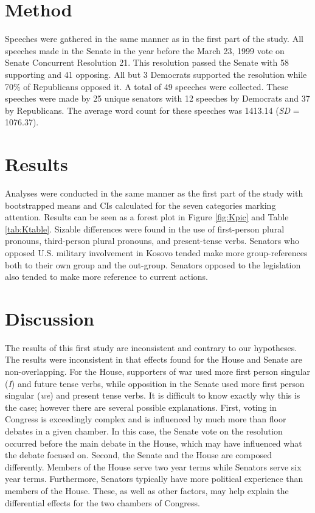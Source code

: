 \documentclass[english,,man]{apa6}
\theoremstyle{definition}
\theoremstyle{definition}
\theoremstyle{definition}
\theoremstyle{remark}
\begin{document}
\hypertarget{method-2}{%
\section{Method}\label{method-2}}

Speeches were gathered in the same manner as in the first part of the
study. All speeches made in the Senate in the year before the March 23,
1999 vote on Senate Concurrent Resolution 21. This resolution passed the
Senate with 58 supporting and 41 opposing. All but 3 Democrats supported
the resolution while 70\% of Republicans opposed it. A total of 49
speeches were collected. These speeches were made by 25 unique senators
with 12 speeches by Democrats and 37 by Republicans. The average word
count for these speeches was 1413.14 (\emph{SD} = 1076.37).

\hypertarget{results-1}{%
\section{Results}\label{results-1}}

Analyses were conducted in the same manner as the first part of the
study with bootstrapped means and CIs calculated for the seven
categories marking attention. Results can be seen as a forest plot in
Figure \ref{fig:Kpic} and Table \ref{tab:Ktable}. Sizable differences
were found in the use of first-person plural pronouns, third-person
plural pronouns, and present-tense verbs. Senators who opposed U.S.
military involvement in Kosovo tended make more group-references both to
their own group and the out-group. Senators opposed to the legislation
also tended to make more reference to current actions.

\hypertarget{discussion}{%
\section{Discussion}\label{discussion}}

The results of this first study are inconsistent and contrary to our
hypotheses. The results were inconsistent in that effects found for the
House and Senate are non-overlapping. For the House, supporters of war
used more first person singular (\emph{I}) and future tense verbs, while
opposition in the Senate used more first person singular (\emph{we}) and
present tense verbs. It is difficult to know exactly why this is the
case; however there are several possible explanations. First, voting in
Congress is exceedingly complex and is influenced by much more than
floor debates in a given chamber. In this case, the Senate vote on the
resolution occurred before the main debate in the House, which may have
influenced what the debate focused on. Second, the Senate and the House
are composed differently. Members of the House serve two year terms
while Senators serve six year terms. Furthermore, Senators typically
have more political experience than members of the House. These, as well
as other factors, may help explain the differential effects for the two
chambers of Congress.
\end{document}
